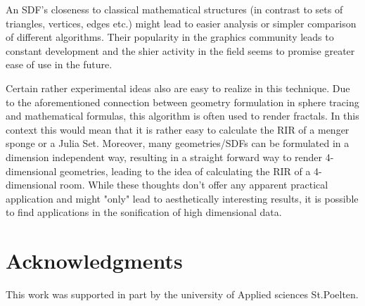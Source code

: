 \documentclass[twoside,a4paper]{article}
\begin{document}
An SDF's closeness to classical mathematical structures (in contrast to sets of triangles, vertices, edges etc.) might lead to easier analysis or simpler comparison of different algorithms. Their popularity in the graphics community leads to constant development and the shier activity in the field seems to promise greater ease of use in the future. \

Certain rather experimental ideas also are easy to realize in this technique. Due to the aforementioned connection between geometry formulation in sphere tracing and mathematical formulas, this algorithm is often used to render fractals. In this context this would mean that it is rather easy to calculate the RIR of a menger sponge or a Julia Set. Moreover, many geometries/SDFs can be formulated in a dimension independent way, resulting in a straight forward way to render 4-dimensional geometries, leading to the idea of calculating the RIR of a 4-dimensional room. While these thoughts don't offer any apparent practical application and might "only" lead to aesthetically interesting results, it is possible to find applications in the sonification of high dimensional data.


\section{Acknowledgments}
This work was supported in part by the university of Applied sciences St.Poelten.

\nocite{*}


\end{document}
